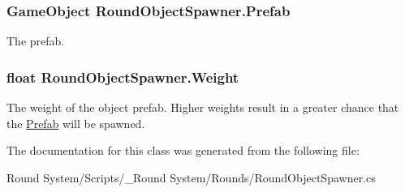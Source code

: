 \subsubsection[{Prefab}]{\setlength{\rightskip}{0pt plus 5cm}Game\+Object Round\+Object\+Spawner.\+Prefab}\label{class_round_object_spawner_aabf387fad5a54de659b38f89f0b47b98}


The prefab. 

\hypertarget{class_round_object_spawner_a4a8acea590e65b61ecf992895306cccc}{}
\subsubsection[{Weight}]{\setlength{\rightskip}{0pt plus 5cm}float Round\+Object\+Spawner.\+Weight}\label{class_round_object_spawner_a4a8acea590e65b61ecf992895306cccc}


The weight of the object prefab. Higher weights result in a greater chance that the \hyperlink{class_round_object_spawner_aabf387fad5a54de659b38f89f0b47b98}{Prefab} will be spawned. 



The documentation for this class was generated from the following file\+:\begin{DoxyCompactItemize}
\item 
Round System/\+Scripts/\+\_\+\+Round System/\+Rounds/Round\+Object\+Spawner.\+cs\end{DoxyCompactItemize}

